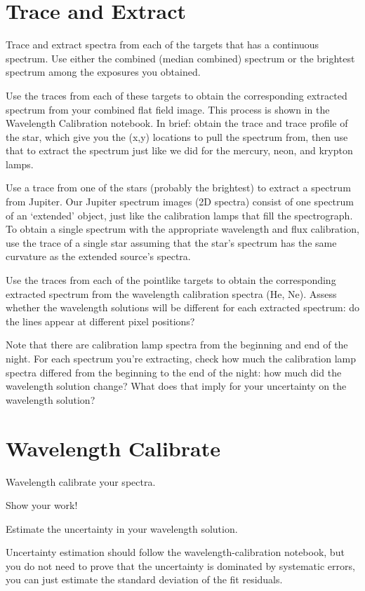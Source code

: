 \documentclass[11pt]{article}
\begin{document}
\section{Trace and Extract}
Trace and extract spectra from each of the targets that has a continuous spectrum.
Use either the combined (median combined) spectrum or the brightest spectrum among the exposures you obtained.

Use the traces from each of these targets to obtain the corresponding extracted
spectrum from your combined flat field image. This process is shown in the
Wavelength Calibration notebook.  In brief: obtain the trace and trace profile
of the star, which give you the (x,y) locations to pull the spectrum from, then
use that to extract the spectrum just like we did for the mercury, neon, and
krypton lamps.

Use a trace from one of the stars (probably the brightest) to extract a spectrum from Jupiter.
{Our Jupiter spectrum images (2D spectra) consist of one spectrum of an `extended' object, just like the
calibration lamps that fill the spectrograph. To obtain a single spectrum with the appropriate
wavelength and flux calibration, use the trace of a single star assuming
that the star's spectrum has the same curvature as the extended source's 
spectra.}

Use the traces from each of the pointlike targets to obtain the corresponding extracted
spectrum from the wavelength calibration spectra (He, Ne).
Assess whether the wavelength solutions will be different for each extracted
spectrum: do the lines appear at different pixel positions?

{Note that there are calibration lamp spectra from the beginning and end of the night.
 For each spectrum you're extracting, check how much the calibration
 lamp spectra differed from the beginning to the end of the night: how
 much did the wavelength solution change?  What does that imply for your
 uncertainty on the wavelength solution?}

\section{Wavelength Calibrate}

Wavelength calibrate your spectra.

Show your work!

Estimate the uncertainty in your wavelength solution.

{Uncertainty estimation should follow the wavelength-calibration notebook,
        but you do not need to prove that the uncertainty is dominated by systematic errors, you
        can just estimate the standard deviation of the fit residuals.}
\end{document}
